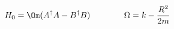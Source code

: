 \begin{equation}
H_0= \Om (A^\dagger A-B^\dagger B) \qquad\qquad \Omega =k-\frac{R^2}{2m}    
 \label{eq:ham2}
\end{equation}

